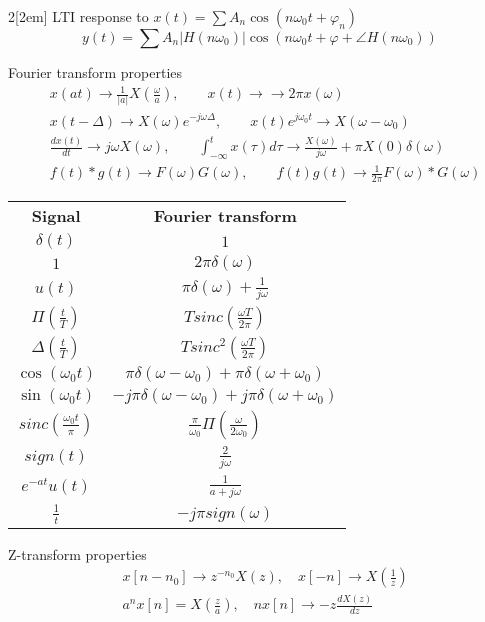 \documentclass{myclass}
\begin{document}
\begin{multicols}{2}[\columnsep2em]
LTI response to $x(t)=\sum A_n \cos(n\omega _0t + \varphi _n)$
\[
y(t) = \sum A_n|H(n\omega _0)|\cos(n\omega_0t+ \varphi + \angle H(n\omega _0))
\] 

Fourier transform properties
\begin{align*}
&x(at)\to  \frac{1}{|a|}X(\frac{\omega}{a}), \qquad x(t) \to  \to  2\pi x(\omega) \\
&x(t-\Delta) \to X(\omega )e^{-j\omega \Delta}, \qquad x(t)e^{j\omega_0 t} \to X(\omega -\omega _0)\\
&\frac{d x(t)}{d t} \to j\omega X(\omega), \qquad \int_{-\infty}^tx(\tau)d\tau \to \frac{X(\omega )}{j\omega  }+ \pi X(0)\delta(\omega ) \\
&f(t)\ast g(t) \to F(\omega )G(\omega ), \qquad f(t)g(t) \to \frac{1}{2\pi}F(\omega )\ast G(\omega )
\end{align*}

\begin{center}
\begin{tabular}{cc}
  \textbf{Signal} & \textbf{Fourier transform}\\
  $\delta(t)$ & $1$ \\
  $1$ & $2\pi \delta(\omega)$\\
  $u(t)$ &  $\pi \delta(\omega ) + \frac{1}{j\omega }$ \\
  $\Pi (\frac{t}{T})$ & $Tsinc(\frac{\omega T}{2\pi})$ \\
  $\Delta  (\frac{t}{T})$ & $Tsinc^2(\frac{\omega T}{2\pi})$ \\
  $\cos(\omega _0t)$ & $\pi\delta(\omega -\omega _0)+ \pi\delta(\omega +\omega _0)$\\
  $\sin(\omega _0t)$ & $-j\pi\delta(\omega -\omega _0)+ j\pi\delta(\omega +\omega _0)$\\
  $sinc(\frac{\omega _0 t}{\pi})$ & $\frac{\pi}{\omega _0}\Pi(\frac{\omega }{2\omega _0})$\\
  $sign(t)$ &   $\frac{2}{j\omega }$\\
  $e^{-at}u(t)$ & $\frac{1}{a+j\omega }$ \\
  $\frac{1}{t}$ & $-j\pi sign(\omega)$
\end{tabular}
\end{center}

Z-transform properties
\begin{align*}
  &x[n-n_0] \to z^{-n_0}X(z), \quad x[-n] \to X(\frac{1}{z})\\
  &a^nx[n] = X(\frac{z}{a}), \quad nx[n] \to -z\frac{d X(z)}{d z} 
\end{align*}


\end{multicols}
\end{document}

